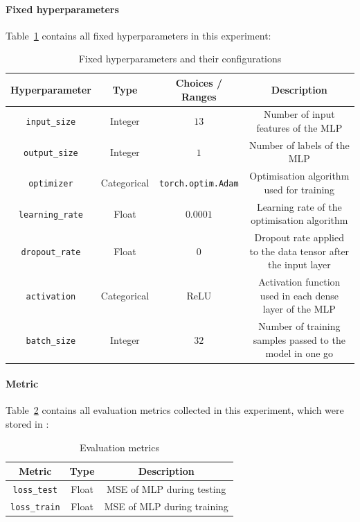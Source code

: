 \documentclass{article}
\begin{document}
\paragraph{Fixed hyperparameters}
Table~\ref{table:experiment_1_fixed_hyperparameters} contains all fixed hyperparameters in this experiment: 

\begin{table}[H]
    \centering
    \begin{tabular}{|c|c|c|c|}
        \hline
        Hyperparameter & Type & Choices / Ranges & Description \\
        \hline
        \small\texttt{input\_size} & Integer & $13$ & Number of input features of the MLP \\
        \hline
        \small\texttt{output\_size} & Integer & $1$ & Number of labels of the MLP \\
        \hline
        \small\texttt{optimizer} & Categorical & \texttt{torch.optim.Adam} & Optimisation algorithm used for training \\
        \hline
        \small\texttt{learning\_rate} & Float & $0.0001$ & Learning rate of the optimisation algorithm \\
        \hline
        \small\texttt{dropout\_rate} & Float & $0$ & Dropout rate applied to the data tensor after the input layer \\
        \hline
        \small\texttt{activation} & Categorical & ReLU & Activation function used in each dense layer of the MLP \\
        \hline
        \small\texttt{batch\_size} & Integer & $32$ & Number of training samples passed to the model in one go \\
        \hline
    \end{tabular}
    \caption{Fixed hyperparameters and their configurations}
    \label{table:experiment_1_fixed_hyperparameters}
\end{table}

\paragraph{Metric}
Table~\ref{table:experiment_1_metric} contains all evaluation metrics collected in this experiment, which were stored in : 

\begin{table}[H]
    \centering
    \begin{tabular}{|c|c|c|}
        \hline
        Metric & Type & Description \\
        \hline
        \small\texttt{loss\_test} & Float & MSE of MLP during testing \\
        \hline
        \small\texttt{loss\_train} & Float & MSE of MLP during training \\
        \hline
    \end{tabular}
    \caption{Evaluation metrics}
    \label{table:experiment_1_metric}
\end{table}
\end{document}

